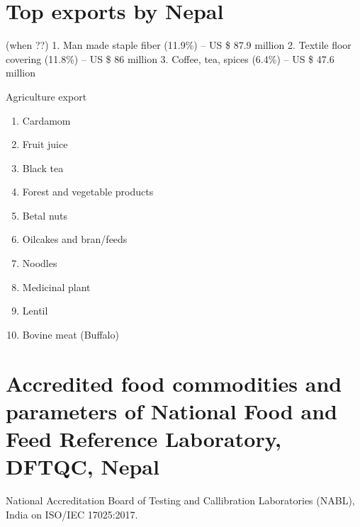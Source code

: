 \documentclass[
  openany]{book}
\providecommand{\tightlist}{%
  \setlength{\itemsep}{0pt}\setlength{\parskip}{0pt}}
\begin{document}
\hypertarget{top-exports-by-nepal}{%
\section{Top exports by Nepal}\label{top-exports-by-nepal}}

(when ??)
1. Man made staple fiber (11.9\%) -- US \$ 87.9 million
2. Textile floor covering (11.8\%) -- US \$ 86 million
3. Coffee, tea, spices (6.4\%) -- US \$ 47.6 million

Agriculture export

\begin{enumerate}
\def\labelenumi{\arabic{enumi}.}
\tightlist
\item
  Cardamom
\item
  Fruit juice
\item
  Black tea
\item
  Forest and vegetable products
\item
  Betal nuts
\item
  Oilcakes and bran/feeds
\item
  Noodles
\item
  Medicinal plant
\item
  Lentil
\item
  Bovine meat (Buffalo)
\end{enumerate}

\hypertarget{accredited-food-commodities-and-parameters-of-national-food-and-feed-reference-laboratory-dftqc-nepal}{%
\section{Accredited food commodities and parameters of National Food and Feed Reference Laboratory, DFTQC, Nepal}\label{accredited-food-commodities-and-parameters-of-national-food-and-feed-reference-laboratory-dftqc-nepal}}

National Accreditation Board of Testing and Callibration Laboratories (NABL), India on ISO/IEC 17025:2017.

\begingroup\fontsize{8}{10}\selectfont
\end{document}
